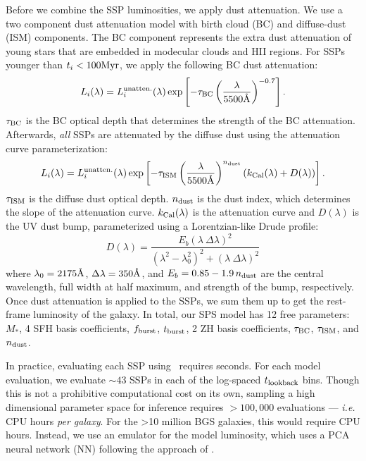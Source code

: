 Before we combine the SSP luminosities, we apply dust attenuation.
We use a two component \cite{charlot2000} dust attenuation model with birth
cloud (BC) and diffuse-dust (ISM) components. 
The BC component represents the extra dust attenuation of young stars that are
embedded in modecular clouds and HII regions. 
For SSPs younger than $t_i < 100{\rm Myr}$, we apply the
following BC dust attenuation: 
\begin{equation}
    L_i(\lambda) = L_i^{\rm unatten.}(\lambda) \exp\left[-\tau_{\rm BC} \left(
    \frac{\lambda}{5500\AA} \right)^{-0.7} \right].
\end{equation}
$\tau_{\rm BC}$ is the BC optical depth that determines the strength of the BC
attenuation. 
Afterwards, {\em all} SSPs are attenuated by the diffuse dust using the
\cite{kriek2013} attenuation curve parameterization: 
\begin{equation}
    L_i(\lambda) = L_i^{\rm unatten.}(\lambda) \exp\left[-\tau_{\rm ISM} \left(
    \frac{\lambda}{5500\AA} \right)^{n_{\rm dust}} \left(k_{\rm Cal}(\lambda) +
    D(\lambda) \right) \right].
\end{equation}
$\tau_{\rm ISM}$ is the diffuse dust optical depth.
$n_{\rm dust}$ is the \cite{calzetti2001} dust index, which determines the
slope of the attenuation curve. 
$k_{\rm Cal}(\lambda)$ is the \cite{calzetti2001} attenuation curve and
$D(\lambda)$ is the UV dust bump, parameterized using a Lorentzian-like Drude 
profile:
\begin{equation}
    D(\lambda) = \frac{E_b(\lambda~\Delta \lambda)^2}{(\lambda^2 -
    \lambda_0^2)^2 + (\lambda~\Delta \lambda)^2}
\end{equation}
where $\lambda_0 = 2175 \AA$, $\Delta \lambda = 350\AA$, and 
$E_b=0.85 - 1.9\,n_{\rm dust}$ are the central wavelength, full width at half
maximum, and strength of the bump, respectively. 
Once dust attenuation is applied to the SSPs, we sum them up to get the
rest-frame luminosity of the galaxy. 
In total, our SPS model has 12 free parameters: $M_*$, 4 SFH basis
coefficients, $f_{\rm burst}$, $t_{\rm burst}$, 2 ZH basis coefficients,
$\tau_{\rm BC}$, $\tau_{\rm ISM}$, and $n_{\rm dust}$. 


In practice, evaluating each SSP using \fsps~requires  seconds. 
For each model evaluation, we evaluate $\sim 43$ SSPs in each of the log-spaced
$t_{\rm lookback}$ bins. 
Though this is not a prohibitive computational cost on its own, sampling a
high dimensional parameter space for inference requires $>100,000$ evaluations
--- \emph{i.e.}  CPU hours \emph{per galaxy}. 
For the >10 million BGS galaxies, this would require 
CPU hours. 
Instead, we use an emulator for the model luminosity, which uses a PCA neural
network (NN) following the approach of \cite{alsing2019}. 


